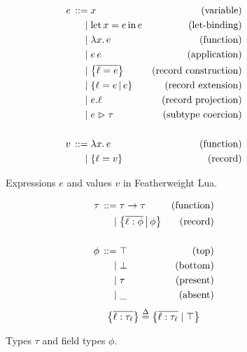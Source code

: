 \begin{subfigure}{.49\textwidth}
\begin{align*}
    \graintro e
    x 
    & \text{(variable)}
    \graitem
    \fllet{x}{e}e
    & \text{(let-binding)}
    \graitem
    \fllam{x} e
    & \text{(function)}
    \graitem
    e\,e
    & \text{(application)}        
    \graitem
    \flrec{\overline{\ell = e}}
    & \text{(record construction)}
    \graitem
    \flext{\ell = e}{e}
    & \text{(record extension)}
    \graitem
    \flproj{e}{\ell}
    & \text{(record projection)}
    \graitem
    \flcast{e}{\tau}
    & \text{(subtype coercion)}
    \\ \\
    \graintro v
    \fllam{x} e
    & \text{(function)}
    \graitem
    \flrec{\ell = v}
    & \text{(record)}
\end{align*}
\caption{Expressions $e$ and values $v$ in Featherweight Lua.}
\label{fig:featherweight-lua-expr}
\end{subfigure}
\hfill
\begin{subfigure}{.49\textwidth}
\begin{align*}
    \graintro \tau
    \tau \to \tau
    & \text{(function)}
    \graitem
    \flext{\overline{\ell : \phi}}{\phi}
    & \text{(record)}
    \\ \\ 
    \graintro \phi 
    \top
    & \text{(top)}
    \graitem
    \bot 
    & \text{(bottom)}
    \graitem
    \tau
    & \text{(present)}
    \graitem
    \flabsent 
    & \text{(absent)}
\end{align*}
$$ \flrec{ \overline{\ell : \tau_\ell} } \defeq \flrec{ \overline{\ell : \tau_\ell} \mid \top } $$
\caption{Types $\tau$ and field types $\phi$.}
\label{fig:featherweight-lua-types}
\end{subfigure}

